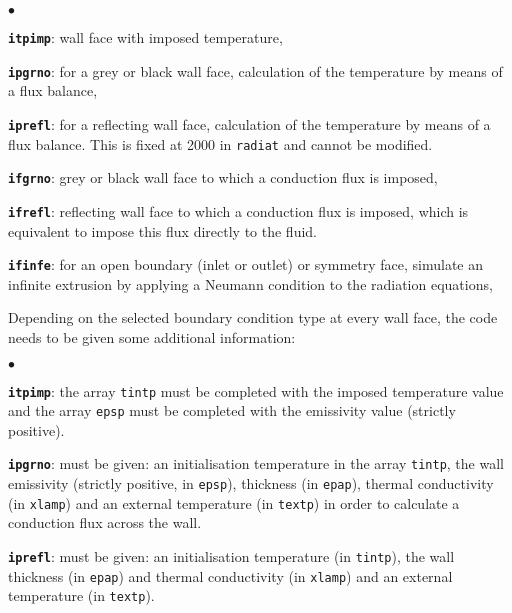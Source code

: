 {{{\begin{list}{$\bullet$}{}

\item \texttt{\textbf{itpimp}}: wall face with imposed temperature,

\item \texttt{\textbf{ipgrno}}: for a grey or black wall face, calculation of the
      temperature by means of a flux balance,

\item \texttt{\textbf{iprefl}}: for a reflecting wall face, calculation of the
      temperature by means of a flux balance.
 This is fixed at 2000 in \texttt{radiat} and cannot be modified.

\item \texttt{\textbf{ifgrno}}: grey or black wall face to which a conduction
      flux is imposed,

\item \texttt{\textbf{ifrefl}}: reflecting wall face to which a conduction
      flux is imposed, which is equivalent to impose this flux directly
      to the fluid.

\item \texttt{\textbf{ifinfe}}: for an open boundary (inlet or outlet) or symmetry face,
      simulate an infinite extrusion by applying a Neumann condition to
      the radiation equations,

\end{list}

\noindent
Depending on the selected boundary condition type at every wall face,
the code needs to be given some additional information:

\begin{list}{$\bullet$}{}

\item \texttt{\textbf{itpimp}}: the array \texttt{tintp} must be completed
      with the imposed temperature value and the array \texttt{epsp} must
      be completed with the emissivity value (strictly positive).

\item \texttt{\textbf{ipgrno}}: must be given: an initialisation temperature in
      the array \texttt{tintp}, the wall emissivity (strictly positive, in
      \texttt{epsp}), thickness (in \texttt{epap}), thermal conductivity
      (in \texttt{xlamp}) and an external temperature (in \texttt{textp})
      in order to calculate a conduction flux across the wall.

\item \texttt{\textbf{iprefl}}: must be given: an initialisation temperature (in
      \texttt{tintp}), the wall thickness (in \texttt{epap}) and thermal conductivity (in
      \texttt{xlamp}) and an external temperature (in \texttt{textp}).


\end{list}}}}
